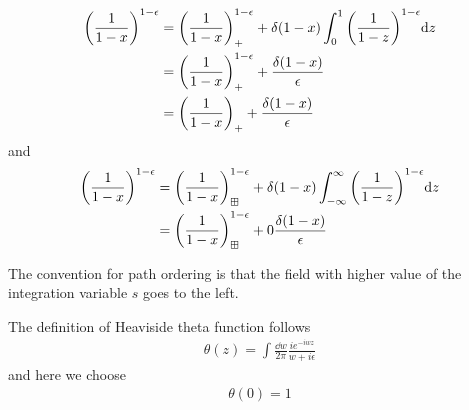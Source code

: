 \documentclass{article}
\begin{document}
\begin{align}
	\pqty{\frac{1}{1-x}}^{1-\epsilon}&=\pqty{\frac{1}{1-x}}^{1-\epsilon}_++\delta(1-x)\int_0^1\pqty{\frac{1}{1-z}}^{1-\epsilon}\dd z\\
	&=\pqty{\frac{1}{1-x}}^{1-\epsilon}_++\frac{\delta(1-x)}{\epsilon}\\
	&=\pqty{\frac{1}{1-x}}_++\frac{\delta(1-x)}{\epsilon}
\end{align}
and
\begin{align}
	\pqty{\frac{1}{1-x}}^{1-\epsilon}&=\pqty{\frac{1}{1-x}}^{1-\epsilon}_{\boxplus}+\delta(1-x)\int_{-\infty}^{\infty}\pqty{\frac{1}{1-z}}^{1-\epsilon}\dd z\\
	&=\pqty{\frac{1}{1-x}}^{1-\epsilon}_{\boxplus}+0\frac{\delta(1-x)}{\epsilon}\\
\end{align}

The convention for path ordering is that the field with higher value of the integration variable $s$ goes to the left.

The definition of Heaviside theta function follows
\begin{align}
	\theta(z)=\int\frac{\dd w}{2\pi}\frac{ie^{-iwz }}{w+i\epsilon}
\end{align}
and here we choose
\begin{align}
	\theta(0)=1
\end{align}
\end{document}
